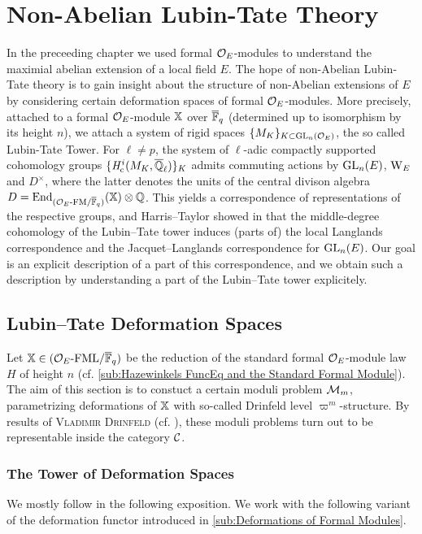 \documentclass[../main.tex]{subfiles}
\begin{document}
\section{Non-Abelian Lubin-Tate Theory} %
\label{sec:Non-Abelian Lubin-Tate Theory: An Overview}
In the preceeding chapter we used formal $\mathcal{O}_E$-modules to understand the 
maximial abelian extension of a local field $E$. The hope of non-Abelian Lubin-Tate
theory is to gain insight about the structure of non-Abelian extensions of $E$
by considering certain deformation spaces of formal $\mathcal{O}_E$-modules.
More precisely, attached to a formal $\mathcal{O}_E$-module $\mathbb{X}$ over ${\overline {\mathbb{F}}_q}$
(determined
up to isomorphism by its height $n$), we attach a system of rigid spaces 
$\{M_K\}_{K \subset \operatorname{GL}_n(\mathcal{O}_E)}$, the so called Lubin-Tate Tower. For $\ell \neq p$, 
the system of $\ell$-adic compactly supported cohomology groups $\{\mathit H_{\mathrm{c}}^{i}(M_K,
\overline {\mathbb{Q}}_\ell)\}_K$ admits commuting actions by $\operatorname{GL}_n(E)$, $\mathrm W_E$ and $D^\times$,
where the latter denotes the units of the central divison algebra $D =
\operatorname{End}_{{({\mathcal{O}_E}\textnormal-\allowbreak\mathrm{FM}/{{\overline {\mathbb{F}}_q}})}}(\mathbb{X}) \otimes \mathbb{Q}$. This yields a correspondence of 
representations of the respective groups, and Harris--Taylor showed in
\cite{HTShimura} that the middle-degree cohomology of the Lubin--Tate tower induces
(parts of) the local Langlands correspondence and the Jacquet--Langlands correspondence
for $\operatorname{GL}_n(E)$. 
Our goal is an explicit description of a part of this correspondence, and we obtain such a
description by understanding a part of the Lubin--Tate tower explicitely.

\subsection{Lubin--Tate Deformation Spaces} %
\label{sub:Lubin-Tate Deformation Spaces}
Let $\mathbb{X} \in {({\mathcal{O}_E}\textnormal-\allowbreak\mathrm{FML}/{{\overline{\mathbb{F}}_q}})}$ be the reduction of the standard formal
$\mathcal{O}_E$-module law $H$ of height $n$ (cf. \cref{sub:Hazewinkels FuncEq and the
Standard Formal Module}).
The aim of this section is to constuct a certain moduli problem $\mathcal{M}_{m}$,
parametrizing deformations of $\mathbb{X}$ with so-called Drinfeld level $\varpi^m$-structure.
By results of \textsc{Vladimir Drinfeld} (cf. \cite{drinfel1974elliptic}),
these moduli problems turn out to be representable inside the category $\mathcal{C}$.

\subsubsection{The Tower of Deformation Spaces} %
\label{ssub:The Tower of Deformation Spaces}
We mostly follow \cite[Chapter 2]{Strauch2008DefSp} in the following
exposition. 
 We work with the following variant of the deformation 
functor introduced in \cref{sub:Deformations of Formal Modules}.
\end{document}
